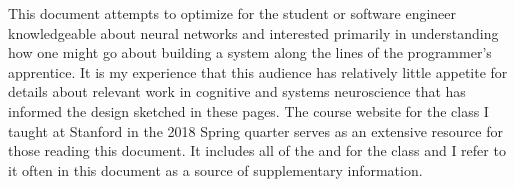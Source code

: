 


This document attempts to optimize for the student or software engineer knowledgeable about neural networks and interested primarily in understanding how one might go about building a system along the lines of the programmer's apprentice. It is my experience that this audience has relatively little appetite for details about relevant work in cognitive and systems neuroscience that has informed the design sketched in these pages. The course website for the class I taught at Stanford in the 2018 Spring quarter serves as an extensive resource for those reading this document. It includes all of the {} and {} for the class and I refer to it often in this document as a source of supplementary information.

